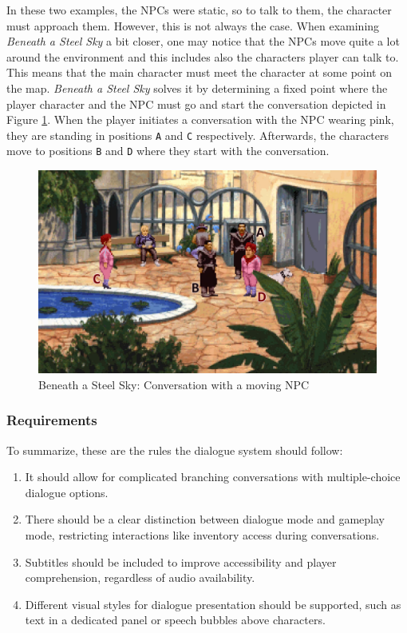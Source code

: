 In these two examples, the NPCs were static, so to talk to them, the character must approach them. However, this is not always the case. When examining \textit{Beneath a Steel Sky} a bit closer, one may notice that the NPCs move quite a lot around the environment and this includes also the characters player can talk to. This means that the main character must meet the character at some point on the map. \textit{Beneath a Steel Sky} solves it by determining a fixed point where the player character and the NPC must go and start the conversation depicted in Figure \ref{fig:C-BaSS3}. When the player initiates a conversation with the NPC wearing pink, they are standing in positions \texttt{A} and \texttt{C} respectively. Afterwards, the characters move to positions \texttt{B} and \texttt{D} where they start with the conversation.

\begin{figure}[H]
\centering
\includegraphics[width=.8\linewidth]{img/C-BaSS2.png}
\caption{Beneath a Steel Sky: Conversation with a moving NPC}
\label{fig:C-BaSS3}
\end{figure}

\subsubsection{Requirements}
To summarize, these are the rules the dialogue system should follow:

\begin{enumerate}[label=\color{teal}\textbf{R{\arabic*}},resume]
  \item \label{intro:req:multi_dialogue} It should allow for complicated branching conversations with multiple-choice dialogue options.
  \item \label{intro:req:modes} There should be a clear distinction between dialogue mode and gameplay mode, restricting interactions like inventory access during conversations.
  \item \label{intro:req:subs} Subtitles should be included to improve accessibility and player comprehension, regardless of audio availability.
  \item \label{intro:req:sub_format} Different visual styles for dialogue presentation should be supported, such as text in a dedicated panel or speech bubbles above characters.
\end{enumerate}


